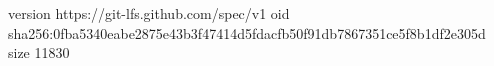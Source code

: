 version https://git-lfs.github.com/spec/v1
oid sha256:0fba5340eabe2875e43b3f47414d5fdacfb50f91db7867351ce5f8b1df2e305d
size 11830
